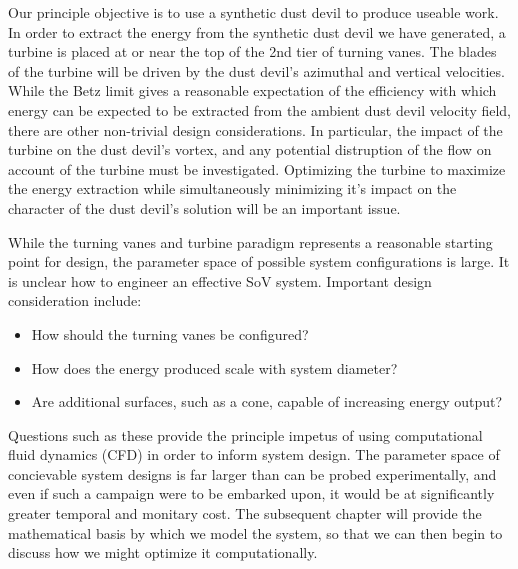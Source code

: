 
Our principle objective is to use a synthetic dust devil to produce 
useable work. In order to extract the energy from the synthetic dust
devil we have generated, a turbine is placed 
at or near the top of the 2nd tier of turning vanes. 
The blades of the turbine will be driven by the dust devil's azimuthal
and vertical velocities. While the Betz limit gives a reasonable
expectation of the efficiency with which energy can be expected to be
extracted from the ambient dust devil velocity field, there are other
non-trivial design considerations. In particular, the impact of the
turbine on the dust devil's vortex, and any potential distruption of the
flow on account of the turbine must be investigated. Optimizing the
turbine to maximize the energy extraction while simultaneously
minimizing it's impact on the character of the dust devil's solution
will be an important issue.

While the turning vanes and turbine  
paradigm represents a reasonable starting point for design, the
parameter space of possible system configurations is large. It is
unclear how to engineer an effective SoV system. Important design
consideration include: 
\begin{itemize}
  \item How should the turning vanes be configured?
  \item How does the energy produced scale with system diameter?
  \item Are additional surfaces, such as a cone, capable of increasing energy output?
\end{itemize}

Questions such as these provide the principle impetus of using
computational fluid dynamics (CFD) in order to inform system design. The
parameter space of concievable system designs is far larger than can be
probed experimentally, and even if such a campaign were to be embarked
upon, it would be at significantly greater temporal and monitary
cost. The subsequent chapter will provide the mathematical basis by which
we model the system, so that we can then begin to discuss how we might
optimize it computationally.  



